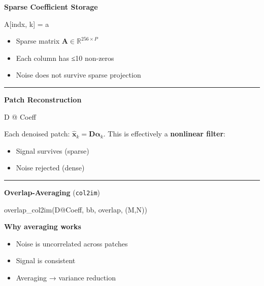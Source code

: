 \documentclass[11pt]{article}
\providecommand{\tightlist}{%
      \setlength{\itemsep}{0pt}\setlength{\parskip}{0pt}}
\newenvironment{Shaded}{}{}
\newcommand{\NormalTok}[1]{{#1}}
\newcommand{\OperatorTok}[1]{\textcolor[rgb]{0.40,0.40,0.40}{{#1}}}
\begin{document}
\textbf{Sparse Coefficient Storage}

\begin{Shaded}
\begin{Highlighting}[]
\NormalTok{A[indx, k] }\OperatorTok{=}\NormalTok{ a}
\end{Highlighting}
\end{Shaded}

\begin{itemize}
\tightlist
\item
  Sparse matrix \(\mathbf{A} \in \mathbb{R}^{256 \times P}\)
\item
  Each column has ≤10 non-zeros
\item
  Noise does not survive sparse projection
\end{itemize}

\begin{center}\rule{0.5\linewidth}{0.5pt}\end{center}

\textbf{Patch Reconstruction}

\begin{Shaded}
\begin{Highlighting}[]
\NormalTok{D }\OperatorTok{@}\NormalTok{ Coeff}
\end{Highlighting}
\end{Shaded}

Each denoised patch:
\(\hat{\mathbf{x}}_k = \mathbf{D}\boldsymbol{\alpha}_k\). This is
effectively a \textbf{nonlinear filter}:

\begin{itemize}
\tightlist
\item
  Signal survives (sparse)
\item
  Noise rejected (dense)
\end{itemize}

\begin{center}\rule{0.5\linewidth}{0.5pt}\end{center}

\textbf{Overlap-Averaging} (\texttt{col2im})

\begin{Shaded}
\begin{Highlighting}[]
\NormalTok{overlap\_col2im(D}\OperatorTok{@}\NormalTok{Coeff, bb, overlap, (M,N))}
\end{Highlighting}
\end{Shaded}

\textbf{Why averaging works}

\begin{itemize}
\tightlist
\item
  Noise is uncorrelated across patches
\item
  Signal is consistent
\item
  Averaging → variance reduction
\end{itemize}
\end{document}

